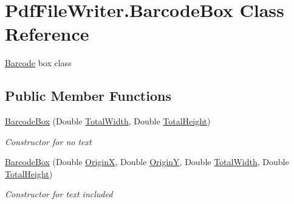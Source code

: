 \hypertarget{class_pdf_file_writer_1_1_barcode_box}{}\section{Pdf\+File\+Writer.\+Barcode\+Box Class Reference}
\label{class_pdf_file_writer_1_1_barcode_box}


\hyperlink{class_pdf_file_writer_1_1_barcode}{Barcode} box class  


\subsection*{Public Member Functions}
\begin{DoxyCompactItemize}
\item 
\hyperlink{class_pdf_file_writer_1_1_barcode_box_a9a7397c317360ccbdfd7164b5c037ce2}{Barcode\+Box} (Double \hyperlink{class_pdf_file_writer_1_1_barcode_box_a6cb4866d8c0b17c7ddfdedd297574def}{Total\+Width}, Double \hyperlink{class_pdf_file_writer_1_1_barcode_box_ab28ba49a22e136caf4373eeed103f98c}{Total\+Height})
\begin{DoxyCompactList}\small\item\em Constructor for no text \end{DoxyCompactList}\item 
\hyperlink{class_pdf_file_writer_1_1_barcode_box_a1f2e35d5c6f078808451d4a0f05303fc}{Barcode\+Box} (Double \hyperlink{class_pdf_file_writer_1_1_barcode_box_a3ef40dad200f4561a241e653b5c8b9e6}{OriginX}, Double \hyperlink{class_pdf_file_writer_1_1_barcode_box_abc7dc3398cb547f7f6bf7890d9231b90}{OriginY}, Double \hyperlink{class_pdf_file_writer_1_1_barcode_box_a6cb4866d8c0b17c7ddfdedd297574def}{Total\+Width}, Double \hyperlink{class_pdf_file_writer_1_1_barcode_box_ab28ba49a22e136caf4373eeed103f98c}{Total\+Height})
\begin{DoxyCompactList}\small\item\em Constructor for text included \end{DoxyCompactList}\end{DoxyCompactItemize}
